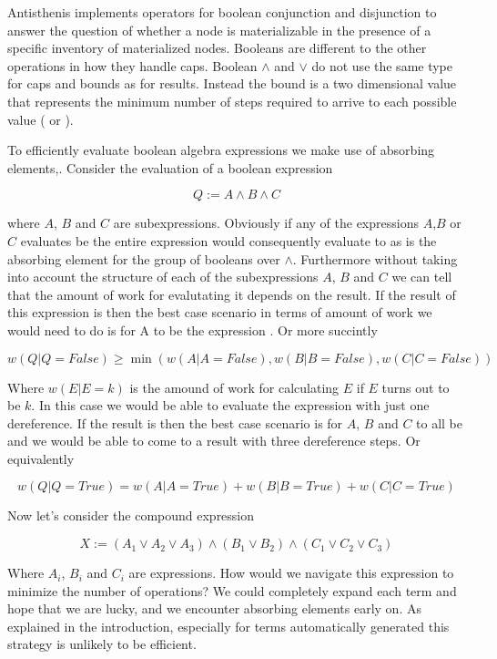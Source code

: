 Antisthenis implements operators for boolean conjunction and
disjunction to answer the question of whether a node is materializable
in the presence of a specific inventory of materialized
nodes. Booleans are different to the other operations in how they
handle caps. Boolean \(\land\) and \(\lor\) do not use the same type
for caps and bounds as for results. Instead the bound is a two
dimensional value that represents the minimum number of steps required
to arrive to each possible value ( or ).

To efficiently evaluate boolean algebra expressions we make use of
absorbing elements,. Consider the evaluation of a boolean expression

\[
Q := A \land B \land C
\]

where \(A\), \(B\) and \(C\) are subexpressions. Obviously if any of
the expressions \(A\),\(B\) or \(C\) evaluates be  the
entire expression would consequently evaluate to  as
 is the absorbing element for the group of booleans over
\(\land\). Furthermore without taking into account the structure of
each of the subexpressions \(A\), \(B\) and \(C\) we can tell that the
amount of work for evalutating it depends on the result. If the result
of this expression is  then the best case scenario in
terms of amount of work we would need to do is for A to be the
expression . Or more succintly

\[
w(Q|Q=\mathit{False}) \ge \min (w(A | A = \mathit{False}), w(B | B = \mathit{False}), w(C | C = \mathit{False}))
\]

Where \(w(E|E=k)\) is the amound of work for calculating \(E\) if
\(E\) turns out to be \(k\). In this case we would be able to evaluate
the expression with just one dereference. If the result is 
then the best case scenario is for \(A\), \(B\) and \(C\) to all be
 and we would be able to come to a result with three
dereference steps. Or equivalently

\[
w(Q|Q=\mathit{True}) = w(A | A = \mathit{True}) + w(B | B = \mathit{True}) + w(C | C = \mathit{True})
\]

Now let's consider the compound expression

\[
X := (A_1 \lor A_2 \lor A_3) \land (B_1 \lor B_2) \land (C_1 \lor C_2 \lor C_3)
\]

Where \(A_i\), \(B_i\) and \(C_i\) are expressions. How would we
navigate this expression to minimize the number of operations?  We
could completely expand each term and hope that we are lucky, and we
encounter absorbing elements early on. As explained in the
introduction, especially for terms automatically generated this
strategy is unlikely to be efficient.


